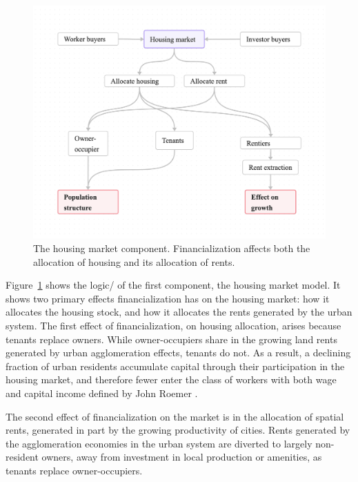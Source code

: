 \begin{figure}[!ht]
\centering
\includegraphics[scale=.20]{fig/flow-impacts.png}
\caption[The housing market component of the model.]{The housing market component. Financialization affects both the allocation of housing and its allocation of rents.}
\label{fig-impacts}
\end{figure}

Figure~\ref{fig-impacts} shows the logic/ of the first component, the housing market model.
It shows two primary effects financialization has on the housing market: how it allocates
the housing stock, and how it allocates the \glspl{rent} generated by the urban system. 
The first effect of financialization, on housing allocation, arises because tenants replace owners. While owner-occupiers share in the growing land rents generated by urban agglomeration effects, tenants do not. As a result, a declining fraction of urban residents accumulate capital through their participation in the housing market, and therefore fewer enter the class of workers with both wage and capital income defined by John Roemer \cite{roemerGeneralTheoryExploitation1982}. 

The second effect of financialization on the market is in the allocation of spatial rents, generated in part by the growing productivity of cities. Rents generated by the \gls{agglomeration} economies in the urban system are diverted to largely non-resident owners, away from investment in local production or amenities, as tenants replace owner-occupiers.

